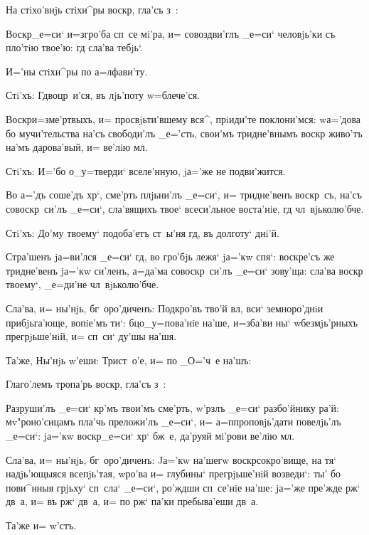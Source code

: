 На стiхо'внjь стiхи^ры воскр, гла'съ з~:

Воскр _е=си` и=з\ъ гро'ба сп~се мi'ра, и= 
совоздви'глъ _е=си` человjь'ки съ пло'тiю твое'ю: гд 
сла'ва тебjь`.

И='ны стiхи^ры по а=лфави'ту.

Стi'хъ: Гд воцр~и'ся, въ лjь'поту w=блече'ся.

Воскр и=з\ъ ме'ртвыхъ, и= просвjьти'вшему вся^, 
прiиди'те поклони'мся: w\т а='дова бо мучи'тельства на'съ 
свободи'лъ _е='сть, свои'мъ тридне'внымъ воскр 
живо'тъ на'мъ дарова'вый, и= ве'лiю мл.

Стi'хъ: И='бо о_у=тверди` вселе'нную, jа='же не 
подви'жится.

Во а='дъ соше'дъ хр`, сме'рть плjьни'лъ _е=си`, и= 
тридне'венъ воскр~съ, на'съ совоскр~си'лъ _е=си`, 
сла'вящихъ твое` всеси'льное воста'нiе, гд 
чл~вjьколю'бче.

Стi'хъ: До'му твоему` подоба'етъ ст~ы'ня гд, въ 
долготу` днi'й.

Стра'шенъ jа=ви'лся _е=си` гд, во гро'бjь лежя` 
jа='кw спя`: воскре'съ же тридне'венъ jа='кw си'ленъ, 
а=да'ма совоскр~си'лъ _е=си` зову'ща: сла'ва воскр 
твоему`, _е=ди'не чл~вjьколю'бче.

Сла'ва, и= ны'нjь, бг~оро'диченъ: Под\ъ кро'въ тво'й 
вл, вси` земноро'днiи прибjьга'юще, вопiе'мъ ти`: 
бц о_у=пова'нiе на'ше, и=зба'ви ны` w\т безмjь'рныхъ 
прегрjьше'нiй, и= сп~си` ду'шы на'шя.

Та'же, Ны'нjь w'еши: Трист~о'е, и= по _О='ч~е 
на'шъ:

Глаго'лемъ тропа'рь воскр, гла'съ з~:

Разруши'лъ _е=си` кр'мъ твои'мъ сме'рть, 
w'рзлъ _е=си` разбо'йнику ра'й: мv"роно'сицамъ пла'чь 
преложи'лъ _е=си`, и= а=п проповjь'дати повелjь'лъ 
_е=си`: jа='кw воскр _е=си` хр` бж~е, да'руяй 
мi'рови ве'лiю мл.

Сла'ва, и= ны'нjь, бг~оро'диченъ: Jа='кw на'шегw 
воскр сокро'вище, на тя` надjь'ющыяся всепjь'тая, 
w\т ро'ва и= глубины` прегрjьше'нiй возведи`: ты' бо 
пови^нныя грjьху` сп~сла` _е=си`, ро'ждши сп~се'нiе 
на'ше: jа='же пре'жде рж` дв~а, и= въ рж` 
дв~а, и= по рж` па'ки пребыва'еши дв~а.

Та'же и= w'стъ.
